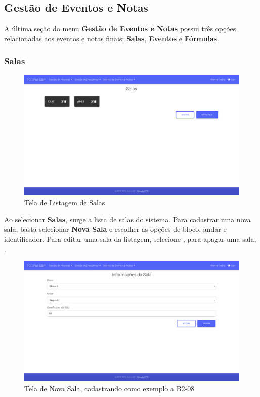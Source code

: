 \subsection{Gestão de Eventos e Notas}
A última seção do menu \textbf{Gestão de Eventos e Notas} possui três opções relacionadas aos eventos e notas finais: \textbf{Salas}, \textbf{Eventos} e \textbf{Fórmulas}.

\subsubsection{Salas}
\begin{figure}[H]
    \centering
    \includegraphics[scale=0.3]{imagens/tela_lista_salas.png}
    \caption{Tela de Listagem de Salas}
    \label{fig:rooms-list}
\end{figure}

Ao selecionar \textbf{Salas}, surge a lista de salas do sistema. Para cadastrar uma nova sala, basta selecionar \textbf{Nova Sala} e escolher as opções de bloco, andar e identificador. Para editar uma sala da listagem, selecione \faEdit, para apagar uma sala, \faTrash.

\begin{figure}[H]
    \centering
    \includegraphics[scale=0.3]{imagens/tela_nova_sala.png}
    \caption{Tela de Nova Sala, cadastrando como exemplo a B2-08}
    \label{fig:rooms-new}
\end{figure}


